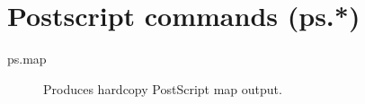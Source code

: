 
\section{Postscript commands (ps.{*})}
\begin{description}
\item [{ps.map}] Produces hardcopy PostScript map output.\end{description}

